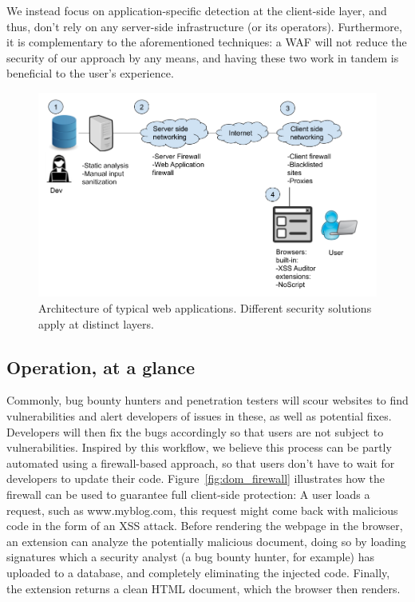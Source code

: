 We instead focus on application-specific detection at the client-side layer, and thus, don't rely on any server-side infrastructure (or its operators). Furthermore, it is complementary to the aforementioned techniques: a WAF will not reduce the security of our approach by any means, and having these two work in tandem is beneficial to the user's experience.

\begin{figure}[h]
	\includegraphics[scale=0.3]{img/web_app_architecture.png}
	\caption{Architecture of typical web applications. Different security solutions apply at distinct layers.}
	\label{fig:web_architecture}
\end{figure}


\subsection{Operation, at a glance}
 Commonly, bug bounty hunters and penetration testers will scour websites to find vulnerabilities and alert developers of issues in these, as well as potential fixes. Developers will then fix the bugs accordingly so that users are not subject to vulnerabilities. Inspired by this workflow, we believe this process can be partly automated using a firewall-based approach, so that users don't have to wait for developers to update their code. Figure~\ref{fig:dom_firewall} illustrates how the firewall can be used to guarantee full client-side protection: A user loads a request, such as www.myblog.com, this request might come back with malicious code in the form of an XSS attack. Before rendering the webpage in the browser, an extension can analyze the potentially malicious document, doing so by loading signatures which a security analyst (a bug bounty hunter, for example) has uploaded to a database, and completely eliminating the injected code. Finally, the extension returns a clean HTML document, which the browser then renders.
 
